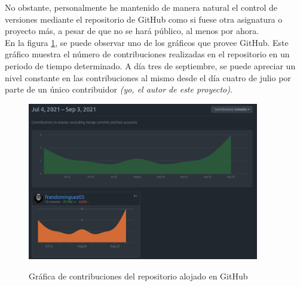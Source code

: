 No obstante, personalmente he mantenido de manera natural el control de versiones mediante el repositorio de GitHub como si fuese otra asignatura o proyecto más, a pesar de que no se hará público, al menos por ahora.\\

En la figura \ref{img:github}, se puede observar uno de los gráficos que provee GitHub. Este gráfico muestra el número de contribuciones realizadas en el repositorio en un periodo de tiempo determinado. A día tres de septiembre, se puede apreciar un nivel constante en las contribuciones al mismo desde el día cuatro de julio por parte de un único contribuidor \textit{(yo, el autor de este proyecto)}.

\begin{figure}[h]
\centering
\includegraphics[width=0.9\textwidth]{logos/github.png}\\[1.4cm]
\caption{Gráfica de contribuciones del repositorio alojado en GitHub}
\label{img:github}
\end{figure}